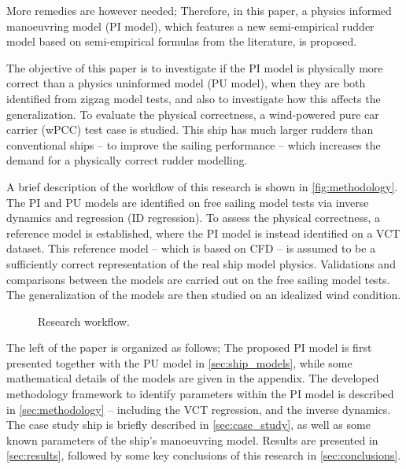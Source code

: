 More remedies are however needed; Therefore, in this paper, a physics informed manoeuvring model (PI model), which features a new semi-empirical rudder model based on semi-empirical formulas from the literature, is proposed.

The objective of this paper is to investigate if the PI model is physically more correct than a physics uninformed model (PU model), when they are both identified from zigzag model tests, and also to investigate how this affects the generalization.
To evaluate the physical correctness, a wind-powered pure car carrier (wPCC) test case is studied. 
This ship has much larger rudders than conventional ships -- to improve the sailing performance -- 
which increases the demand for a physically correct rudder modelling.

A brief description of the workflow of this research is shown in \autoref{fig:methodology}.
The PI and PU models are identified on free sailing model tests via inverse dynamics \citep{faber_inverse_2018} and regression (ID regression). To assess the physical correctness, a reference model is established, where the PI model is instead identified on a VCT dataset. This reference model -- which is based on CFD -- is assumed to be a sufficiently correct representation of the real ship model physics.
Validations and comparisons between the models are carried out on the free sailing model tests. The generalization of the models are then studied on an idealized wind condition.
%
\begin{figure}[h]
  \centering
  
  \caption{Research workflow.}
  \label{fig:methodology}
\end{figure}

The left of the paper is organized as follows; The proposed PI model is first presented together with the PU 
 model in \autoref{sec:ship_models}, while some mathematical details of the models are given in the appendix. 
The developed methodology framework to identify parameters within the PI model is described in \autoref{sec:methodology} -- including the VCT regression, and the inverse dynamics. The case study ship is briefly described in \autoref{sec:case_study}, as well as some known parameters of the ship's manoeuvring model. Results are presented in \autoref{sec:results}, followed by some key conclusions of this research in \autoref{sec:conclusions}.